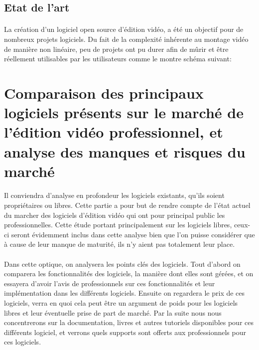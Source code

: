 \newpage

\subsection{Etat de l'art}

\paragraph{}
La création d'un logiciel open source d'édition vidéo, a été un
objectif pour de nombreux projets logiciels. Du fait de la complexité
inhérente au montage vidéo de manière non linéaire, peu de projets
ont pu durer afin de mûrir et être réellement utilisables par les
utilisateurs comme le montre schéma suivant:

\section{Comparaison des principaux logiciels présents sur le marché de
l'édition vidéo professionnel, et analyse des manques et risques du marché}

\paragraph{}
  Il conviendra d'analyse en profondeur les logiciels existants, qu'ils soient
  propriétaires ou libres. Cette partie a pour but de rendre compte de
  l'état actuel du marcher des logiciels d'édition vidéo qui ont pour principal
  public les professionnelles. Cette étude portant principalement
  sur les logiciels libres, ceux-ci seront évidemment inclus dans cette analyse
  bien que l'on puisse considérer que à cause de leur manque de maturité, ils
  n'y aient pas totalement leur place.

\paragraph{}
  Dans cette optique, on analysera les points clés des logiciels. 
  Tout d'abord on comparera les fonctionnalités des
  logiciels, la manière dont elles sont gérées, et on essayera d'avoir l'avis de
  professionnels sur ces fonctionnalités et leur implémentation dans les différents
  logiciels. Ensuite on regardera le prix de ces logiciels, verra en quoi cela
  peut être un argument de poids pour les logiciels libres et leur éventuelle
  prise de part de marché. Par la suite nous nous concentrerons sur la documentation,
  livres et autres tutoriels disponibles pour ces différents logiciel, et verrons
  quels supports sont offerts aux professionnels pour ces logiciels.

